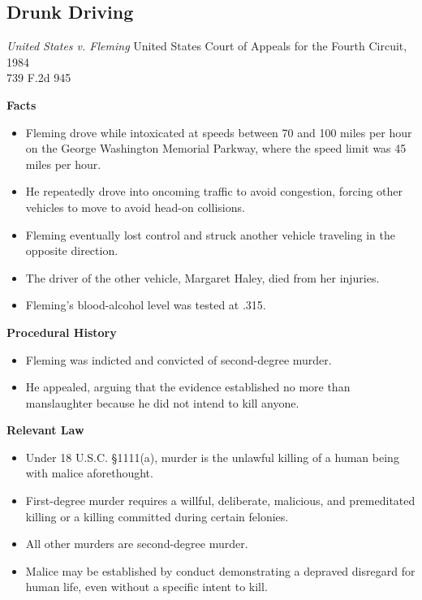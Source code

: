 \documentclass[11pt]{tex/lawoutline}
\begin{document}
\subsection{Drunk Driving}
\casebox
    {\textit{United States v. Fleming}}
    {United States Court of Appeals for the Fourth Circuit, 1984\\
    739 F.2d 945}
    {
        \textbf{Facts}
        \begin{itemize}
            \item Fleming drove while intoxicated at speeds between 70 and 100 miles per hour on the George Washington Memorial Parkway, where the speed limit was 45 miles per hour.
            \item He repeatedly drove into oncoming traffic to avoid congestion, forcing other vehicles to move to avoid head-on collisions.
            \item Fleming eventually lost control and struck another vehicle traveling in the opposite direction.
            \item The driver of the other vehicle, Margaret Haley, died from her injuries.
            \item Fleming's blood-alcohol level was tested at .315.
        \end{itemize}

        \textbf{Procedural History}
        \begin{itemize}
            \item Fleming was indicted and convicted of second-degree murder.
            \item He appealed, arguing that the evidence established no more than manslaughter because he did not intend to kill anyone.
        \end{itemize}

        \textbf{Relevant Law}
        \begin{itemize}
            \item Under 18 U.S.C. \S 1111(a), murder is the unlawful killing of a human being with malice aforethought.
            \item First-degree murder requires a willful, deliberate, malicious, and premeditated killing or a killing committed during certain felonies.
            \item All other murders are second-degree murder.
            \item Malice may be established by conduct demonstrating a depraved disregard for human life, even without a specific intent to kill.
        \end{itemize}

}
\end{document}
